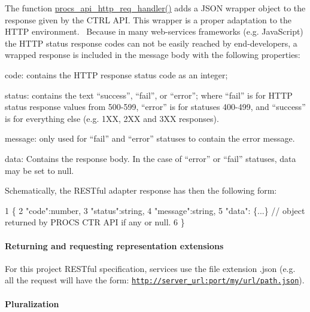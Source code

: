The function \textquotesingle{}\hyperlink{procs__api__http_8c_af95ab7d53c13d03d65d8cd0dacd3463f}{procs\+\_\+api\+\_\+http\+\_\+req\+\_\+handler()}\textquotesingle{} adds a J\+S\+ON wrapper object to the response given by the C\+T\+RL A\+PI. This wrapper is a proper adaptation to the H\+T\+TP environment.~\newline
 Because in many web-\/services frameworks (e.\+g. Java\+Script) the H\+T\+TP status response codes can not be easily reached by end-\/developers, a wrapped response is included in the message body with the following properties\+:
\begin{DoxyItemize}
\item code\+: contains the H\+T\+TP response status code as an integer;
\item status\+: contains the text “success”, “fail”, or “error”; where “fail” is for H\+T\+TP status response values from 500-\/599, “error” is for statuses 400-\/499, and “success” is for everything else (e.\+g. 1\+XX, 2\+XX and 3\+XX responses).
\item message\+: only used for “fail” and “error” statuses to contain the error message.
\item data\+: Contains the response body. In the case of “error” or “fail” statuses, data may be set to \textquotesingle{}null\textquotesingle{}.
\end{DoxyItemize}

Schematically, the R\+E\+S\+Tful adapter response has then the following form\+: 
\begin{DoxyCode}
1 \{
2     "code":number,
3     "status":string,
4     "message":string,
5     "data": \{...\} // object returned by PROCS CTR API if any or null.
6 \}
\end{DoxyCode}


\paragraph*{Returning and requesting representation extensions}

For this project R\+E\+S\+Tful specification, services use the file extension \textquotesingle{}.json\textquotesingle{} (e.\+g. all the request will have the form\+: \textquotesingle{}\href{http://server_url:port/my/url/path.json'}{\tt http\+://server\+\_\+url\+:port/my/url/path.\+json\textquotesingle{}}).

\paragraph*{Pluralization}

